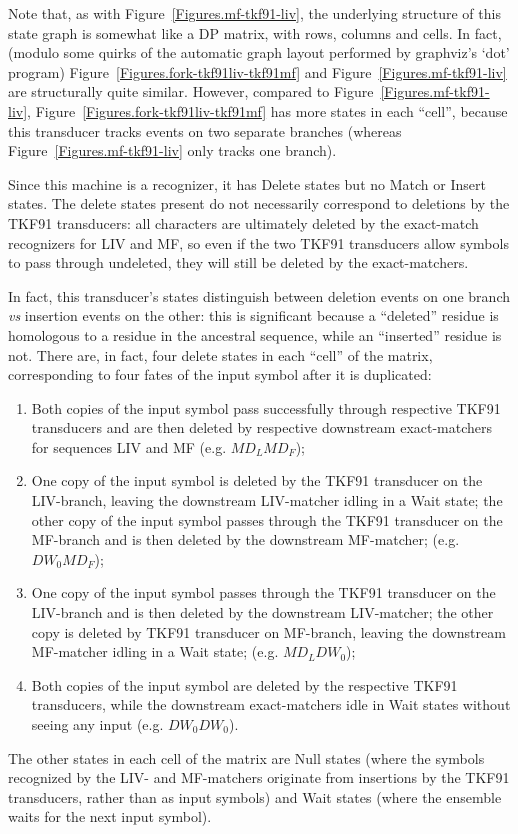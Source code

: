 \documentclass{article}
\newcommand{\figref}[1]{Figure~\ref{Figures.#1}}
\begin{document}
Note that, as with \figref{mf-tkf91-liv},
the underlying structure of this state graph is somewhat like a DP matrix,
with rows, columns and cells.
In fact, 
(modulo some quirks of the automatic graph layout performed by graphviz's `dot' program)
\figref{fork-tkf91liv-tkf91mf} and \figref{mf-tkf91-liv} are structurally quite similar.
However, compared to \figref{mf-tkf91-liv},
\figref{fork-tkf91liv-tkf91mf} has more states in each ``cell'',
because this transducer tracks events on two separate branches
(whereas \figref{mf-tkf91-liv} only tracks one branch).

Since this machine is a recognizer, it has Delete states but no Match or Insert states.
The delete states present do not necessarily correspond to  deletions by the TKF91 transducers:
all characters are ultimately deleted by the exact-match recognizers for LIV and MF,
so even if the two TKF91 transducers allow symbols to pass through undeleted,
they will still be deleted by the exact-matchers.

In fact, this transducer's states distinguish between
deletion events on one branch {\em vs} insertion events on the other:
this is significant because a ``deleted'' residue is homologous to a residue in the ancestral sequence,
while an ``inserted'' residue is not.
There are, in fact, four delete states in each ``cell'' of the matrix,
corresponding to four fates of the input symbol after it is duplicated:
\begin{enumerate}
\item Both copies of the input symbol pass successfully through respective TKF91 transducers
and are then deleted by respective downstream exact-matchers for sequences LIV and MF
 (e.g. $M D_L M D_F$);
\item One copy of the input symbol is deleted by the TKF91 transducer on the LIV-branch,
leaving the downstream LIV-matcher idling in a Wait state;
the other copy of the input symbol passes through the TKF91 transducer on the MF-branch and is then deleted by the downstream MF-matcher;
 (e.g. $D W_0 M D_F$);
\item One copy of the input symbol passes through the TKF91 transducer on the LIV-branch
and is then deleted by the downstream LIV-matcher;
the other copy is deleted by TKF91 transducer on MF-branch,
leaving the downstream MF-matcher idling in a Wait state;
 (e.g. $M D_L D W_0$);
\item Both copies of the input symbol are deleted by the respective TKF91 transducers,
while the downstream exact-matchers idle in Wait states without seeing any input
 (e.g. $D W_0 D W_0$).
\end{enumerate}
The other states in each cell of the matrix are Null states
(where the symbols recognized by the LIV- and MF-matchers originate from insertions by the TKF91 transducers,
rather than as input symbols)
and Wait states (where the ensemble waits for the next input symbol).
\end{document}

